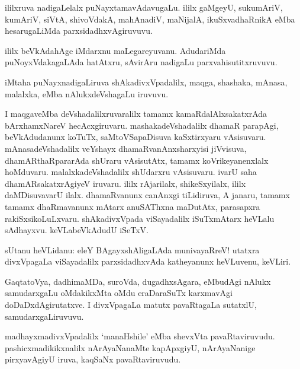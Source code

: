 \documentclass{article}
\begin{document}
\begin{mn}
ililxruva nadigaLelalx puNayxtamavAdavugaLu. ililx gaMgeyU, sukumAriV, kumAriV, 
siVtA, shivoVdakA, mahAnadiV, maNijalA, ikuSxvadhaRnikA eMba hesarugaLiMda parxsidadhxvAgiruvuvu.
\end{mn}

\begin{mn}
ililx beVkAdahAge iMdarxnu maLegareyuvanu. AdudariMda puNoyxVdakagaLAda hatAtxru, sAvirAru 
nadigaLu parxvahisutitxruvuvu.
\end{mn}

\begin{mn}
iMtaha puNayxnadigaLiruva shAkadivxVpadalilx, maqga, shashaka, mAnasa, malalxka, eMba 
nAlukxdeVshagaLu iruvuvu.
\end{mn}

\begin{mn}
I maqgaveMba deVshadalilxruvaralilx tamamx kamaRdalAlxsakatxrAda bArxhamxNareV hecAcxgiruvaru.
mashakadeVshadalilx dhamaR parapAgi, beVkAdudanunx koTuTx, saMtoVSapaDisuva kaSxtirxyaru vAsisuvaru.
mAnasadeVshadalilx veYshayx dhamaRvanAnxsharxyisi jiVvisuva, dhamARthaRpararAda shUraru 
vAsisutAtx, tamamx koVrikeyanenxlalx hoMduvaru. malalxkadeVshadalilx shUdarxru vAsisuvaru.
ivarU saha dhamARsakatxrAgiyeV iruvaru. ililx rAjarilalx,
shikeSxyilalx, ililx daMDisuvavarU ilalx. dhamaRvanunx canAnxgi tiLidiruva, A janaru, tamamx
tamamx dhaRmavanunx mAtarx anuSAThxna maDutAtx, parasapxra rakiSxsikoLuLxvaru. shAkadivxVpada 
viSayadalilx iSuTxmAtarx heVLalu sAdhayxvu. keVLabeVkAdudU iSeTxV.
\end{mn}


\begin{mn}
sUtanu heVLidanu: eleY BAgayxshAligaLAda munivayaRreV! utatxra divxVpagaLa 
viSayadalilx parxsidadhxvAda katheyanunx heVLuvenu, keVLiri.
\end{mn}

\begin{mn}
GaqtatoVya, dadhimaMDa, suroVda, dugadhxsAgara, eMbudAgi nAlukx samudarxgaLu oMdakikxMta oMdu 
eraDaraSuTx karxmavAgi doDaDxdAgirutatxve. I divxVpagaLa matutx pavaRtagaLa sutatxlU, 
samudarxgaLiruvuvu.
\end{mn}

\begin{mn}
madhayxmadivxVpadalilx `manaHshile' eMba shevxVta pavaRtaviruvudu. pashicxmadikikxnalilx 
nArAyaNanaMte kapApxgiyU, nArAyaNanige pirxyavAgiyU iruva, kaqSaNx pavaRtaviruvudu.
\end{mn}
\end{document}

